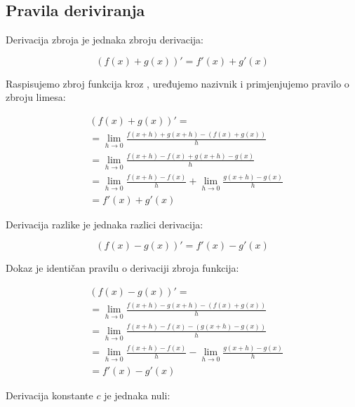 \subsection{Pravila deriviranja}

\begin{multicols}{2}

\begin{proposition}
    Derivacija zbroja je jednaka zbroju derivacija:

    $$
        (f(x)+g(x))' = f'(x) + g'(x)
    $$
\end{proposition}

Raspisujemo zbroj funkcija kroz ,
uređujemo nazivnik i primjenjujemo pravilo o zbroju limesa:

\begin{align*}
    &(f(x)+g(x))'=\\
    &=\lim_{h\to 0}\frac{f(x+h)+g(x+h)-(f(x)+g(x))}{h}\\
    &=\lim_{h\to 0}\frac{f(x+h)-f(x)+g(x+h)-g(x)}{h}\\
    &=\lim_{h\to 0}\frac{f(x+h)-f(x)}{h} + \lim_{h\to 0}\frac{g(x+h)-g(x)}{h}\\
    &=f'(x) + g'(x)
\end{align*}

\begin{proposition}
    Derivacija razlike je jednaka razlici derivacija:

    $$
        (f(x)-g(x))' = f'(x) - g'(x)
    $$
\end{proposition}

Dokaz je identičan pravilu o derivaciji zbroja funkcija:

\begin{align*}
    &(f(x)-g(x))'=\\
    &=\lim_{h\to 0}\frac{f(x+h)-g(x+h)-(f(x)+g(x))}{h}\\
    &=\lim_{h\to 0}\frac{f(x+h)-f(x)-(g(x+h)-g(x))}{h}\\
    &=\lim_{h\to 0}\frac{f(x+h)-f(x)}{h} - \lim_{h\to 0}\frac{g(x+h)-g(x)}{h}\\
    &=f'(x) - g'(x)
\end{align*}

\newcolumn

\begin{proposition}
    Derivacija konstante $c$ je jednaka nuli:


\end{proposition}
\end{multicols}
